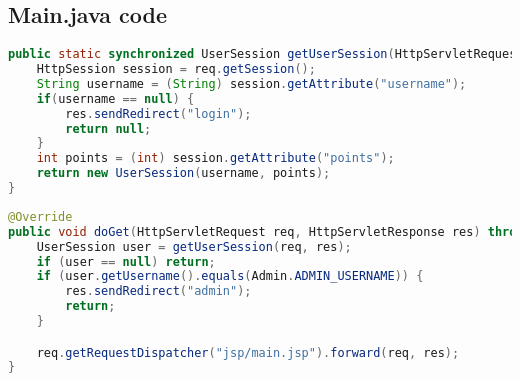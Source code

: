 \subsection{Main.java code}
\begin{lstlisting}[language=java, caption={method to get the user from the session}]
public static synchronized UserSession getUserSession(HttpServletRequest req, HttpServletResponse res) throws IOException {
    HttpSession session = req.getSession();
    String username = (String) session.getAttribute("username");
    if(username == null) {
        res.sendRedirect("login");
        return null;
    }
    int points = (int) session.getAttribute("points");
    return new UserSession(username, points);
}
\end{lstlisting}
\begin{lstlisting}[language=java, caption={GET method for main page}]
@Override
public void doGet(HttpServletRequest req, HttpServletResponse res) throws IOException, ServletException {
    UserSession user = getUserSession(req, res);
    if (user == null) return;
    if (user.getUsername().equals(Admin.ADMIN_USERNAME)) {
        res.sendRedirect("admin");
        return;
    }

    req.getRequestDispatcher("jsp/main.jsp").forward(req, res);
}
\end{lstlisting}
